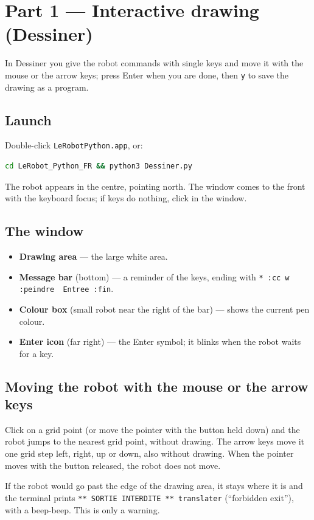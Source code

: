 \documentclass[11pt,a4paper]{article}
\newcommand{\kbd}[1]{\texttt{#1}}
\begin{document}
\section{Part 1 --- Interactive drawing (Dessiner)}

In Dessiner you give the robot commands with single keys and move it with
the mouse or the arrow keys; press Enter when you are done, then \kbd{y} to
save the drawing as a program.

\subsection{Launch}
Double-click \kbd{LeRobotPython.app}, or:
\begin{lstlisting}[language=bash]
cd LeRobot_Python_FR && python3 Dessiner.py
\end{lstlisting}
The robot appears in the centre, pointing north. The window comes to the
front with the keyboard focus; if keys do nothing, click in the window.

\subsection{The window}
\begin{itemize}
\item \textbf{Drawing area} --- the large white area.
\item \textbf{Message bar} (bottom) --- a reminder of the keys, ending with
  \kbd{* :cc w :peindre\ \ Entree :fin}.
\item \textbf{Colour box} (small robot near the right of the bar) --- shows
  the current pen colour.
\item \textbf{Enter icon} (far right) --- the Enter symbol; it blinks when
  the robot waits for a key.
\end{itemize}

\subsection{Moving the robot with the mouse or the arrow keys}
Click on a grid point (or move the pointer with the button held down) and
the robot jumps to the nearest grid point, without drawing. The arrow keys
move it one grid step left, right, up or down, also without drawing. When
the pointer moves with the button released, the robot does not move.

If the robot would go past the edge of the drawing area, it stays where it
is and the terminal prints \kbd{** SORTIE INTERDITE ** translater}
(``forbidden exit''), with a beep-beep. This is only a warning.
\end{document}
